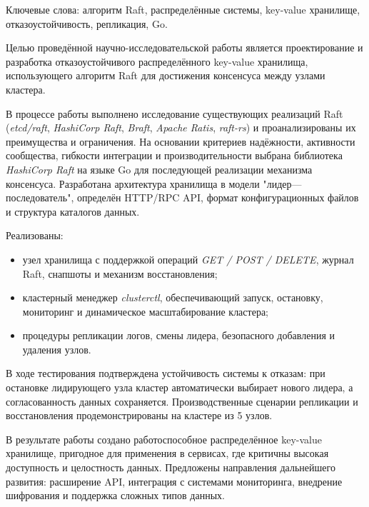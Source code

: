 \abstract

Ключевые слова: алгоритм Raft, распределённые системы, key-value хранилище, отказоустойчивость, репликация, Go.

Целью проведённой научно-исследовательской работы является проектирование и разработка отказоустойчивого распределённого key-value
хранилища, использующего алгоритм Raft для достижения консенсуса между узлами кластера.

В процессе работы выполнено исследование существующих реализаций Raft (\textit{etcd/raft}, \textit{HashiCorp Raft}, \textit{Braft},
\textit{Apache Ratis}, \textit{raft-rs}) и проанализированы их преимущества и ограничения. На основании критериев надёжности,
активности сообщества, гибкости интеграции и производительности выбрана библиотека \textit{HashiCorp Raft} на языке Go для
последующей реализации механизма консенсуса. Разработана архитектура хранилища в модели "лидер—последователь", определён HTTP/RPC
API, формат конфигурационных файлов и структура каталогов данных.

Реализованы:
\begin{itemize}
    \item узел хранилища с поддержкой операций \textit{GET / POST / DELETE}, журнал Raft, снапшоты и механизм восстановления;
    \item кластерный менеджер \textit{clusterctl}, обеспечивающий запуск, остановку, мониторинг и динамическое масштабирование
          кластера;
    \item процедуры репликации логов, смены лидера, безопасного добавления и удаления узлов.
\end{itemize}

В ходе тестирования подтверждена устойчивость системы к отказам: при остановке лидирующего узла кластер автоматически выбирает
нового лидера, а согласованность данных сохраняется. Производственные сценарии репликации и восстановления продемонстрированы на
кластере из 5 узлов.

В результате работы создано работоспособное распределённое key-value хранилище, пригодное для применения в сервисах,
где критичны высокая доступность и целостность данных. Предложены направления дальнейшего развития: расширение API, интеграция
с системами мониторинга, внедрение шифрования и поддержка сложных типов данных.
